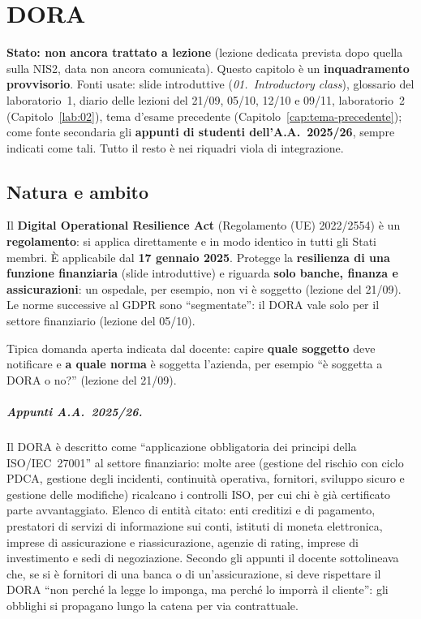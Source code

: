 \chapter{DORA}
\label{cap:dora}

\begin{nota}
\textbf{Stato: non ancora trattato a lezione} (lezione dedicata prevista dopo quella sulla NIS2, data
non ancora comunicata). Questo capitolo è un \textbf{inquadramento provvisorio}. Fonti usate: slide
introduttive (\emph{01.~Introductory class}), glossario del laboratorio~1, diario delle lezioni del
21/09, 05/10, 12/10 e 09/11, laboratorio~2 (Capitolo~\ref{lab:02}), tema d'esame precedente
(Capitolo~\ref{cap:tema-precedente}); come fonte secondaria gli \textbf{appunti di studenti
dell'A.A.~2025/26}, sempre indicati come tali. Tutto il resto è nei riquadri viola di integrazione.
\end{nota}

\section{Natura e ambito}
\label{sec:dora-ambito}

Il \textbf{Digital Operational Resilience Act} (Regolamento (UE) 2022/2554) è un \textbf{regolamento}:
si applica direttamente e in modo identico in tutti gli Stati membri. È applicabile dal
\textbf{17 gennaio 2025}. Protegge la \textbf{resilienza di una funzione finanziaria} (slide
introduttive) e riguarda \textbf{solo banche, finanza e assicurazioni}: un ospedale, per esempio, non
vi è soggetto (lezione del 21/09). Le norme successive al GDPR sono ``segmentate'': il DORA vale solo
per il settore finanziario (lezione del 05/10).

\begin{esame}
Tipica domanda aperta indicata dal docente: capire \textbf{quale soggetto} deve notificare e \textbf{a
quale norma} è soggetta l'azienda, per esempio ``è soggetta a DORA o no?'' (lezione del 21/09).
\end{esame}

\paragraph{Appunti A.A.~2025/26.} Il DORA è descritto come ``applicazione obbligatoria dei principi
della ISO/IEC~27001'' al settore finanziario: molte aree (gestione del rischio con ciclo PDCA, gestione
degli incidenti, continuità operativa, fornitori, sviluppo sicuro e gestione delle modifiche)
ricalcano i controlli ISO, per cui chi è già certificato parte avvantaggiato. Elenco di entità citato:
enti creditizi e di pagamento, prestatori di servizi di informazione sui conti, istituti di moneta
elettronica, imprese di assicurazione e riassicurazione, agenzie di rating, imprese di investimento e
sedi di negoziazione. Secondo gli appunti il docente sottolineava che, se si è fornitori di una banca o
di un'assicurazione, si deve rispettare il DORA ``non perché la legge lo imponga, ma perché lo imporrà
il cliente'': gli obblighi si propagano lungo la catena per via contrattuale.

